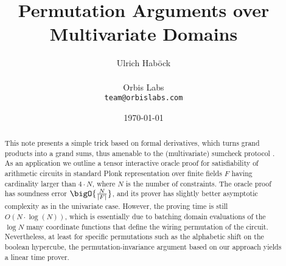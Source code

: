 \documentclass[11pt]{article}
\author{%
Ulrich Hab{\"o}ck
\\\\
Orbis Labs
\\
\texttt{team@orbislabs.com}
}
\theoremstyle{definition}
\theoremstyle{remark}
\begin{document}
\title{%
Permutation Arguments over Multivariate Domains 
%
}
\date{%
\today
}
\maketitle



\begin{abstract}
This note presents a simple trick based on formal derivatives, which turns grand products into a grand sums, thus amenable to the (multivariate) sumcheck protocol \cite{sumcheck}.
As an application we outline a tensor interactive oracle proof for satisfiability of arithmetic circuits in standard Plonk representation \cite{Plonk} over finite fields $F$ having cardinality larger than $4\cdot N$, where $N$ is the number of constraints.
The oracle proof has soundness error $\bigO{\nicefrac{N}{|F|}}$, and its  prover has slightly better asymptotic complexity as in the univariate case. 
However, the proving time is still $O(N\cdot \log(N))$, which is essentially due to batching domain evaluations of the $\log N$ many coordinate functions that define the wiring permutation of the circuit.
Nevertheless, at least for specific permutations such as the alphabetic shift on the boolean hypercube, the permutation-invariance argument based on our approach yields a linear time prover. 
%
\end{abstract}


 \tableofcontents

\end{document}
